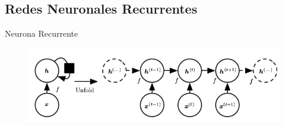 
\subsection{Redes Neuronales Recurrentes}

\begin{frame}{Neurona Recurrente}
    \begin{figure}
        \centering
        \includegraphics[keepaspectratio=true,height=1\paperheight,width=0.8\paperwidth]{Images/grafo computacional 1.png}
    \end{figure}
\end{frame}


